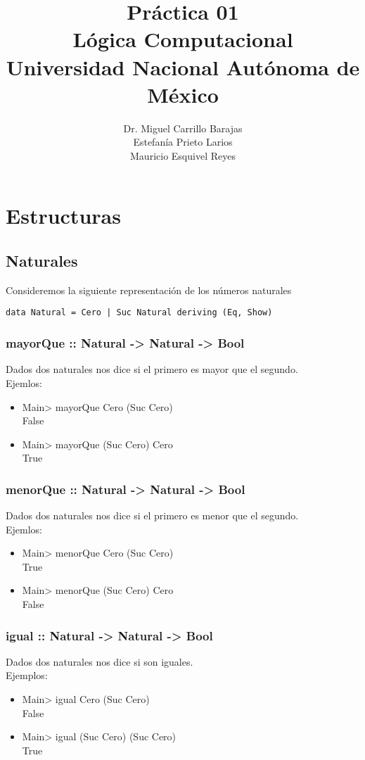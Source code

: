 \documentclass[11pt]{article}
\author{Dr. Miguel Carrillo Barajas \\
Estefanía Prieto Larios \\
Mauricio Esquivel Reyes \\
}
\date{}
\title{Práctica 01 \\
Lógica Computacional \\
Universidad Nacional Autónoma de México}
\begin{document}
\maketitle
\section{Estructuras}
\label{sec:orgc3aa747}
\subsection{Naturales}
\label{sec:orgba3c743}
Consideremos la siguiente representación de los números naturales

\begin{verbatim}
data Natural = Cero | Suc Natural deriving (Eq, Show)
\end{verbatim}
\subsubsection{mayorQue :: Natural -> Natural -> Bool}
\label{sec:org644eed7}
Dados dos naturales nos dice si el primero es mayor que el segundo.\\
Ejemlos:
\begin{itemize}
\item Main> mayorQue Cero (Suc Cero)\\
False
\item Main> mayorQue (Suc Cero) Cero\\
True
\end{itemize}
\subsubsection{menorQue :: Natural -> Natural -> Bool}
\label{sec:orgb9c8a81}
Dados dos naturales nos dice si el primero es menor que el segundo.\\
Ejemlos:
\begin{itemize}
\item Main> menorQue Cero (Suc Cero)\\
True
\item Main> menorQue (Suc Cero) Cero\\
False
\end{itemize}
\subsubsection{igual :: Natural -> Natural -> Bool}
\label{sec:org4beb979}
Dados dos naturales nos dice si son iguales.\\
Ejemplos:
\begin{itemize}
\item Main> igual Cero (Suc Cero)\\
False
\item Main> igual (Suc Cero) (Suc Cero)\\
True
\end{itemize}
\end{document}

